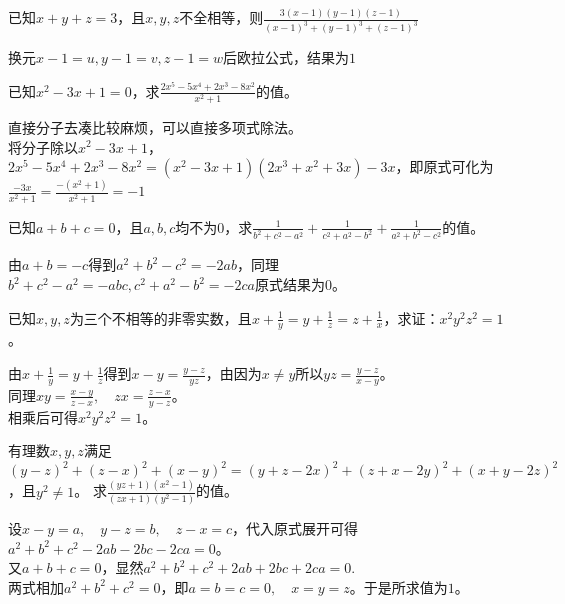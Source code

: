 \documentclass[windows,csize4]{BHCexam}
\begin{document}
\begin{groups}
\begin{questions}[]
        \question[5] 已知$x+y+z=3$，且$x,y,z$不全相等，则$\frac{3(x-1)(y-1)(z-1)}{(x-1)^3+(y-1)^3+(z-1)^3}$
        \begin{solution}{0.5cm}
            \methodonly 换元$x-1=u, y-1=v, z-1=w$后欧拉公式，结果为$1$
        \end{solution}
        \vspace{4.5cm}

        \question[5] 已知$x^2-3x+1=0$，求$\frac{2x^5-5x^4+2x^3-8x^2}{x^2+1}$的值。
        \begin{solution}{0.5cm}
            \methodonly 直接分子去凑比较麻烦，可以直接多项式除法。\\
            将分子除以$x^2-3x+1$，\\
            $2x^5-5x^4+2x^3-8x^2=(x^2-3x+1)(2x^3+x^2+3x)-3x$，即原式可化为 \\
            $\frac{-3x}{x^2+1}=\frac{-(x^2+1)}{x^2+1}=-1$
        \end{solution}
        \vspace{4.5cm}

        \question[5] 已知$a+b+c=0$，且$a,b,c$均不为$0$，求$\frac{1}{b^2+c^2-a^2}+\frac{1}{c^2+a^2-b^2}+\frac{1}{a^2+b^2-c^2}$的值。
        \begin{solution}{0.5cm}
            \methodonly 由$a+b=-c$得到$a^2+b^2-c^2=-2ab$，同理$b^2+c^2-a^2=-abc, c^2+a^2-b^2=-2ca$原式结果为$0$。
        \end{solution}
        \vspace{4.5cm}

        \question[5] 已知$x,y,z$为三个不相等的非零实数，且$x+\frac{1}{y}=y+\frac{1}{z}=z+\frac{1}{x}$，求证：$x^2y^2z^2=1$。
        \begin{solution}{0.5cm}
            \methodonly 由$x+\frac{1}{y}=y+\frac{1}{z}$得到$x-y=\frac{y-z}{yz}$，由因为$x\neq y$所以$yz=\frac{y-z}{x-y}$。\\
            同理$xy=\frac{x-y}{z-x},\quad zx=\frac{z-x}{y-z}$。\\
            相乘后可得$x^2y^2z^2=1$。
        \end{solution}
        \vspace{4.5cm}

        \question[5] 有理数$x,y,z$满足$(y-z)^2+(z-x)^2+(x-y)^2=(y+z-2x)^2+(z+x-2y)^2+(x+y-2z)^2$，且$y^2\neq 1$。
        求$\frac{(yz+1)(x^2-1)}{(zx+1)(y^2-1)}$的值。
        \begin{solution}{0.5cm}
            \methodonly 设$x-y=a, \quad y-z=b, \quad z-x=c$，代入原式展开可得$a^2+b^2+c^2-2ab-2bc-2ca=0$。\\
            又$a+b+c=0$，显然$a^2+b^2+c^2+2ab+2bc+2ca=0$.\\
            两式相加$a^2+b^2+c^2=0$，即$a=b=c=0, \quad x=y=z$。于是所求值为$1$。
        \end{solution}

    \end{questions}

\end{groups}


\label{lastpage}
\end{document}
